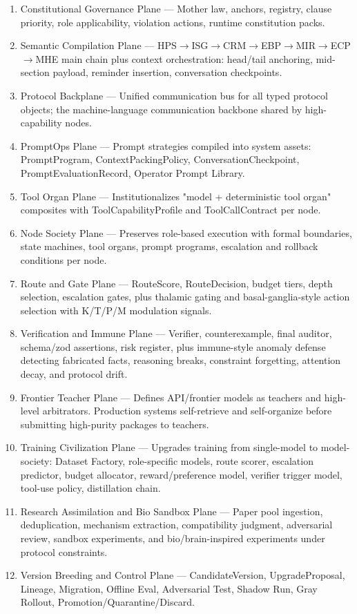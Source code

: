 \documentclass[12pt,a4paper]{article}
\begin{document}
\begin{enumerate}
  \item Constitutional Governance Plane --- Mother law, anchors, registry, clause priority, role applicability, violation actions, runtime constitution packs.
  \item Semantic Compilation Plane --- HPS$\rightarrow$ISG$\rightarrow$CRM$\rightarrow$EBP$\rightarrow$MIR$\rightarrow$ECP$\rightarrow$MHE main chain plus context orchestration: head/tail anchoring, mid-section payload, reminder insertion, conversation checkpoints.
  \item Protocol Backplane --- Unified communication bus for all typed protocol objects; the machine-language communication backbone shared by high-capability nodes.
  \item PromptOps Plane --- Prompt strategies compiled into system assets: PromptProgram, ContextPackingPolicy, ConversationCheckpoint, PromptEvaluationRecord, Operator Prompt Library.
  \item Tool Organ Plane --- Institutionalizes "model + deterministic tool organ" composites with ToolCapabilityProfile and ToolCallContract per node.
  \item Node Society Plane --- Preserves role-based execution with formal boundaries, state machines, tool organs, prompt programs, escalation and rollback conditions per node.
  \item Route and Gate Plane --- RouteScore, RouteDecision, budget tiers, depth selection, escalation gates, plus thalamic gating and basal-ganglia-style action selection with K/T/P/M modulation signals.
  \item Verification and Immune Plane --- Verifier, counterexample, final auditor, schema/zod assertions, risk register, plus immune-style anomaly defense detecting fabricated facts, reasoning breaks, constraint forgetting, attention decay, and protocol drift.
  \item Frontier Teacher Plane --- Defines API/frontier models as teachers and high-level arbitrators. Production systems self-retrieve and self-organize before submitting high-purity packages to teachers.
  \item Training Civilization Plane --- Upgrades training from single-model to model-society: Dataset Factory, role-specific models, route scorer, escalation predictor, budget allocator, reward/preference model, verifier trigger model, tool-use policy, distillation chain.
  \item Research Assimilation and Bio Sandbox Plane --- Paper pool ingestion, deduplication, mechanism extraction, compatibility judgment, adversarial review, sandbox experiments, and bio/brain-inspired experiments under protocol constraints.
  \item Version Breeding and Control Plane --- CandidateVersion, UpgradeProposal, Lineage, Migration, Offline Eval, Adversarial Test, Shadow Run, Gray Rollout, Promotion/Quarantine/Discard.
\end{enumerate}
\end{document}
